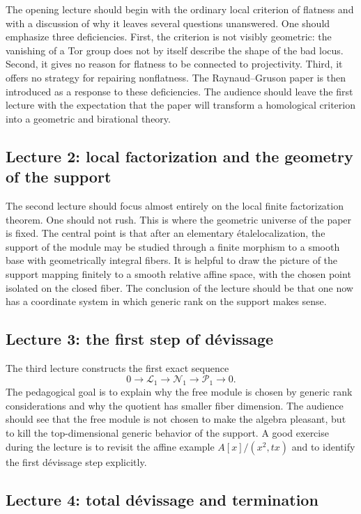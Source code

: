 \documentclass[11pt,oneside]{article}
\newcommand{\Lcal}{\mathcal L}
\newcommand{\N}{\mathcal N}
\newcommand{\Pcal}{\mathcal P}
\newcommand{\etale}{\'etale}
\begin{document}
The opening lecture should begin with the ordinary local criterion of flatness and with a discussion of why it leaves several questions unanswered.  One should emphasize three deficiencies.  First, the criterion is not visibly geometric: the vanishing of a Tor group does not by itself describe the shape of the bad locus.  Second, it gives no reason for flatness to be connected to projectivity.  Third, it offers no strategy for repairing nonflatness.  The Raynaud--Gruson paper is then introduced as a response to these deficiencies.  The audience should leave the first lecture with the expectation that the paper will transform a homological criterion into a geometric and birational theory.

\subsection*{Lecture 2: local factorization and the geometry of the support}

The second lecture should focus almost entirely on the local finite factorization theorem.  One should not rush.  This is where the geometric universe of the paper is fixed.  The central point is that after an elementary \etale localization, the support of the module may be studied through a finite morphism to a smooth base with geometrically integral fibers.  It is helpful to draw the picture of the support mapping finitely to a smooth relative affine space, with the chosen point isolated on the closed fiber.  The conclusion of the lecture should be that one now has a coordinate system in which generic rank on the support makes sense.

\subsection*{Lecture 3: the first step of d\'evissage}

The third lecture constructs the first exact sequence
\[
0\to \Lcal_1\to \N_1\to \Pcal_1\to 0.
\]
The pedagogical goal is to explain why the free module is chosen by generic rank considerations and why the quotient has smaller fiber dimension.  The audience should see that the free module is not chosen to make the algebra pleasant, but to kill the top-dimensional generic behavior of the support.  A good exercise during the lecture is to revisit the affine example $A[x]/(x^2,tx)$ and to identify the first d\'evissage step explicitly.

\subsection*{Lecture 4: total d\'evissage and termination}
\end{document}
